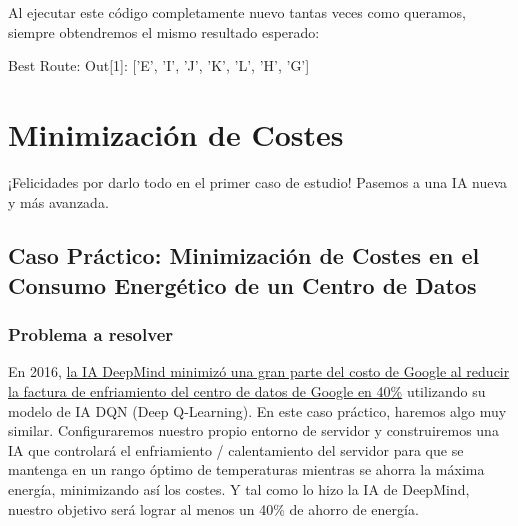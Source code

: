 \documentclass[]{book}
\newenvironment{Shaded}{\begin{snugshade}}{\end{snugshade}}
\newcommand{\DecValTok}[1]{\textcolor[rgb]{0.00,0.00,0.81}{#1}}
\newcommand{\NormalTok}[1]{#1}
\newcommand{\StringTok}[1]{\textcolor[rgb]{0.31,0.60,0.02}{#1}}
\begin{document}
Al ejecutar este código completamente nuevo tantas veces como queramos, siempre obtendremos el mismo resultado esperado:

\begin{Shaded}
\begin{Highlighting}[]
\NormalTok{Best Route:}
\NormalTok{Out[}\DecValTok{1}\NormalTok{]: [}\StringTok{'E'}\NormalTok{, }\StringTok{'I'}\NormalTok{, }\StringTok{'J'}\NormalTok{, }\StringTok{'K'}\NormalTok{, }\StringTok{'L'}\NormalTok{, }\StringTok{'H'}\NormalTok{, }\StringTok{'G'}\NormalTok{]}
\end{Highlighting}
\end{Shaded}

\hypertarget{minimizaciuxf3n-de-costes}{%
\chapter{Minimización de Costes}\label{minimizaciuxf3n-de-costes}}

¡Felicidades por darlo todo en el primer caso de estudio! Pasemos a una IA nueva y más avanzada.

\hypertarget{caso-pruxe1ctico-minimizaciuxf3n-de-costes-en-el-consumo-energuxe9tico-de-un-centro-de-datos}{%
\section{Caso Práctico: Minimización de Costes en el Consumo Energético de un Centro de Datos}\label{caso-pruxe1ctico-minimizaciuxf3n-de-costes-en-el-consumo-energuxe9tico-de-un-centro-de-datos}}

\hypertarget{problema-a-resolver-1}{%
\subsection{Problema a resolver}\label{problema-a-resolver-1}}

En 2016, \href{https://deepmind.com/blog/deepmind-ai-reduces-google-data-centre-cooling-bill-40/}{la IA DeepMind minimizó una gran parte del costo de Google al reducir la factura de enfriamiento del centro de datos de Google en 40\%} utilizando su modelo de IA DQN (Deep Q-Learning). En este caso práctico, haremos algo muy similar. Configuraremos nuestro propio entorno de servidor y construiremos una IA que controlará el enfriamiento / calentamiento del servidor para que se mantenga en un rango óptimo de temperaturas mientras se ahorra la máxima energía, minimizando así los costes. Y tal como lo hizo la IA de DeepMind, nuestro objetivo será lograr al menos un 40\% de ahorro de energía.
\end{document}
